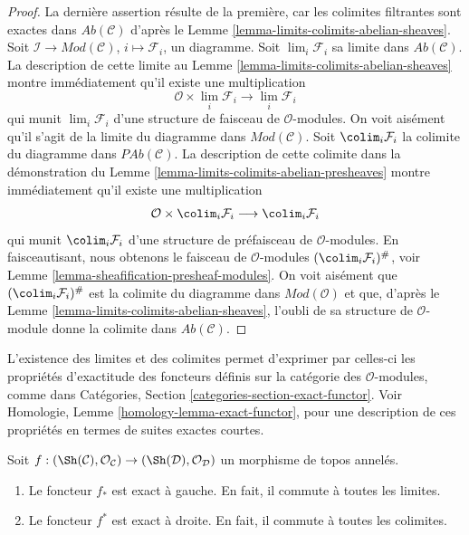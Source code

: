\begin{proof}
La dernière assertion résulte de la première, car les colimites filtrantes sont
exactes dans $\textit{Ab}(\mathcal{C})$ d'après le Lemme
\ref{lemma-limits-colimits-abelian-sheaves}. Soit
$\mathcal{I} \to \textit{Mod}(\mathcal{C})$, $i \mapsto \mathcal{F}_i$, un
diagramme. Soit $\lim_i \mathcal{F}_i$ sa limite dans
$\textit{Ab}(\mathcal{C})$. La description de cette limite au Lemme
\ref{lemma-limits-colimits-abelian-sheaves} montre immédiatement qu'il existe
une multiplication
$$
\mathcal{O} \times \lim_i \mathcal{F}_i
\longrightarrow
\lim_i \mathcal{F}_i
$$
qui munit $\lim_i \mathcal{F}_i$ d'une structure de faisceau de
$\mathcal{O}$-modules. On voit aisément qu'il s'agit de la limite du diagramme
dans $\textit{Mod}(\mathcal{C})$. Soit $\colim_i \mathcal{F}_i$ la colimite du
diagramme dans $\textit{PAb}(\mathcal{C})$. La description de cette colimite
dans la démonstration du Lemme
\ref{lemma-limits-colimits-abelian-presheaves} montre immédiatement qu'il
existe une multiplication
$$
\mathcal{O} \times \colim_i \mathcal{F}_i
\longrightarrow
\colim_i \mathcal{F}_i
$$
qui munit $\colim_i \mathcal{F}_i$ d'une structure de préfaisceau de
$\mathcal{O}$-modules. En faisceautisant, nous obtenons le faisceau de
$\mathcal{O}$-modules $(\colim_i \mathcal{F}_i)^\#$, voir Lemme
\ref{lemma-sheafification-presheaf-modules}. On voit aisément que
$(\colim_i \mathcal{F}_i)^\#$ est la colimite du diagramme dans
$\textit{Mod}(\mathcal{O})$ et que, d'après le Lemme
\ref{lemma-limits-colimits-abelian-sheaves}, l'oubli de sa structure de
$\mathcal{O}$-module donne la colimite dans $\textit{Ab}(\mathcal{C})$.
\end{proof}

\noindent
L'existence des limites et des colimites permet d'exprimer par celles-ci les
propriétés d'exactitude des foncteurs définis sur la catégorie des
$\mathcal{O}$-modules, comme dans Catégories, Section
\ref{categories-section-exact-functor}. Voir Homologie, Lemme
\ref{homology-lemma-exact-functor}, pour une description de ces propriétés en
termes de suites exactes courtes.

\begin{lemma}
\label{lemma-exactness-pushforward-pullback}
Soit $f : (\Sh(\mathcal{C}), \mathcal{O}_\mathcal{C})
\to (\Sh(\mathcal{D}), \mathcal{O}_\mathcal{D})$
un morphisme de topos annelés.
\begin{enumerate}
\item Le foncteur $f_*$ est exact à gauche. En fait, il commute à toutes les
limites.
\item Le foncteur $f^*$ est exact à droite. En fait, il commute à toutes les
colimites.
\end{enumerate}
\end{lemma}

